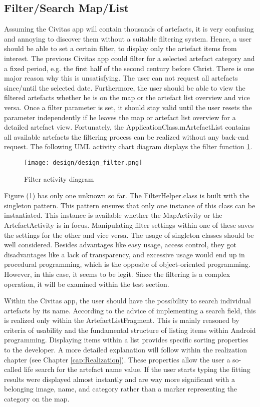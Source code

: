 \subsection{Filter/Search Map/List}
Assuming the Civitas app will contain thousands of artefacts, it is very confusing and annoying to discover them without a suitable filtering system. Hence, a user should be able to set a certain filter, to display only the artefact items from interest. The previous Civitas app could filter for a selected artefact category and a fixed period, e.g. the first half of the second century before Christ. There is one major reason why this is unsatisfying. The user can not request all artefacts since/until the selected date. Furthermore, the user should be able to view the filtered artefacts whether he is on the map or the artefact list overview and vice versa. Once a filter parameter is set, it should stay valid until the user resets the parameter independently if he leaves the map or artefact list overview for a detailed artefact view. Fortunately, the ApplicationClass.mArtefactList contains all available artefacts the filtering process can be realized without any back-end request. The following UML activity chart diagram displays the filter function \ref{fig:design_filter}.

\begin{figure}[H]
    \centering \texttt{[image: design/design\_filter.png]}
    \caption{Filter activity diagram}    
    \label{fig:design_filter}
\end{figure}
Figure (\ref{fig:design_filter}) has only one unknown so far. The FilterHelper.class is built with the singleton pattern. This pattern ensures that only one instance of this class can be instantiated. This instance is available whether the MapActivity or the ArtefactActivity is in focus. Manipulating filter settings within one of these saves the settings for the other and vice versa. The usage of singleton classes should be well considered. Besides advantages like easy usage, access control, they got disadvantages like a lack of transparency, and excessive usage would end up in procedural programming, which is the opposite of object-oriented programming. However, in this case, it seems to be legit. Since the filtering is a complex operation, it will be examined within the test section.
 
Within the Civitas app, the user should have the possibility to search individual artefacts by its name. According to the advice of implementing a search field, this is realized only within the ArtefactListFragment. This is mainly reasoned by criteria of usability and the fundamental structure of listing items within Android programming. Displaying items within a list provides specific sorting properties to the developer. A more detailed explanation will follow within the realization chapter (see Chapter \ref{cap:Realization}). These properties allow the user a so-called life search for the artefact name value. If the user starts typing the fitting results were displayed almost instantly and are way more significant with a belonging image, name, and category rather than a marker representing the category on the map.



